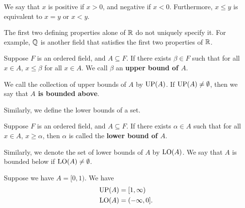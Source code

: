 \documentclass[a4paper]{article}
\begin{document}
\begin{remark}
   We say that \( x  \) is positive if \( x > 0  \), and negative if \( x < 0  \). Furthermore, \( x \leq y  \) is equivalent to \( x = y  \) or \( x < y  \). 
\end{remark}

The first two defining properties alone of \( \mathbb{R}  \) do not uniquely specify it. For example, \( \mathbb{Q}  \) is another field that satisfies the first two properties of \( \mathbb{R}  \). 

\begin{definition}\label{Upper Bound}
   Suppose \( F  \) is an ordered field, and \( A \subseteq F  \). If there exists \( \beta \in F  \) such that for all \( x \in A  \), \( x \leq \beta  \) for all \( x \in A  \). We call \( \beta  \) an \textbf{upper bound of \( A  \)}.
\end{definition}
\begin{remark}
    We call the collection of upper bounds of \( A  \) by \( \operatorname{UP}(A) \). If \( \operatorname{UP}(A) \neq \emptyset  \), then we say that \textbf{\( A  \) is bounded above}. 
\end{remark}

Similarly, we define the lower bounds of a set.
\begin{definition}\label{Lower Bound}
   Suppose \( F  \) is an ordered field, and \( A \subseteq F \). If there exists \( \alpha \in A  \) such that for all \( x \in A  \), \( x \geq \alpha  \), then \( \alpha  \) is called the \textbf{lower bound of \( A  \)}.
\end{definition}
\begin{remark}
    Similarly, we denote the set of lower bounds of \( A  \) by \( \operatorname{LO}(A) \). We say that \( A  \) is bounded below if \( \operatorname{LO}(A) \neq \emptyset \).
\end{remark}

\begin{eg}
    Suppose we have \( A = [0,1) \). We have
    \begin{align*}
        \operatorname{UP}(A) &= [1, \infty ) \\
        \operatorname{LO}(A) &= (-\infty, 0].
    \end{align*}
\end{eg}
\end{document}
